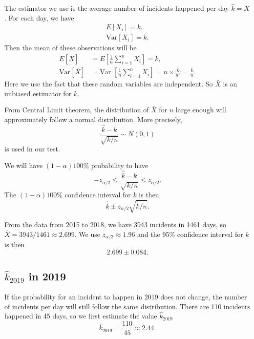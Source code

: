 \documentclass[11pt,a4paper,english]{article}
\begin{document}
The estimator we use is the average number of incidents happened per day $\hat{k} = \bar{X}$.
For each day, we have 
\begin{align*}
	E[X_{i}] = k,\\
	\text{Var}[X_{i}] = k.
\end{align*}
Then the mean of these observations will be
\begin{align*}
	E[\bar{X}] &= E[\frac{1}{n}\sum_{i = 1}^{n}X_{i}] = k,\\
	\text{Var}[\bar{X}] &= \text{Var }[\frac{1}{n}\sum_{i = 1}^{n}X_{i}] = n \times \frac{k}{n^{2}} = \frac{k}{n}.
\end{align*}
Here we use the fact that these random variables are independent. So $\bar{X}$ is an unbiased estimator for $k$.

From Central Limit theorem, the distribution of $\bar{X}$ for $n$ large enough will approximately follow a normal distribution. More precisely,
\begin{equation*}
	\frac{\hat{k}-k}{\sqrt{k/n}} \sim N(0,1)
\end{equation*}
is used in our test. 

We will have $(1-\alpha)100\%$ probability to have 
\begin{equation*}
	-z_{\alpha/2} \leq \frac{\hat{k}-k}{\sqrt{k/n}} \leq z_{\alpha/2}.
\end{equation*}
The $(1-\alpha)100\%$ confidence interval for $k$ is then 
\begin{equation*}
	\hat{k} \pm z_{\alpha/2}\sqrt{\hat{k}/n}.
\end{equation*}

From the data from 2015 to 2018, we have 3943 incidents in 1461 days, so $\bar{X} = 3943/1461 \approx 2.699$. We use $z_{\alpha/2} \approx 1.96$ and the 95\% confidence interval for $k$ is then 
\begin{equation*}
	2.699 \pm 0.084.
\end{equation*}

\subsection{$\hat{k}_{2019}$ in 2019}
If the probability for an incident to happen in 2019 does not change, the number of incidents per day will still follow the same distribution. There are 110 incidents happened in 45 days, so we first estimate the value $\hat{k}_{2019}$
\begin{equation*}
	\hat{k}_{2019} = \frac{110}{45} \approx 2.44.
\end{equation*}
\end{document}
